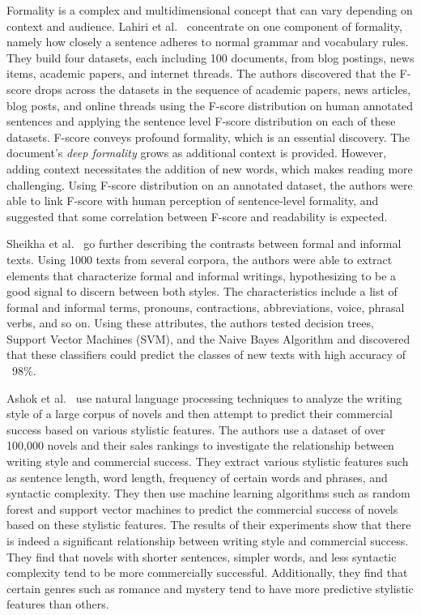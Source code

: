 \documentclass[akbc,twoside,11pt]{article}
\begin{document}
Formality is a complex and multidimensional concept that can vary depending on context and audience. Lahiri et al.~\cite{lahiri2011informality} concentrate on one component of formality, namely how closely a sentence adheres to normal grammar and vocabulary rules. They build four datasets, each including 100 documents, from blog postings, news items, academic papers, and internet threads. The authors discovered that the F-score drops across the datasets in the sequence of academic papers, news articles, blog posts, and online threads using the F-score distribution on human annotated sentences and applying the sentence level F-score distribution on each of these datasets. F-score conveys profound formality, which is an essential discovery. The document's \textit{deep formality} grows as additional context is provided. However, adding context necessitates the addition of new words, which makes reading more challenging. Using F-score distribution on an annotated dataset, the authors were able to link F-score with human perception of sentence-level formality, and suggested that some correlation between F-score and readability is expected. 

Sheikha et al.~\cite{sheikha2010automatic} go further describing the contrasts between formal and informal texts. Using 1000 texts from several corpora, the authors were able to extract elements that characterize formal and informal writings, hypothesizing to be a good signal to discern between both styles. The characteristics include a list of formal and informal terms, pronouns, contractions, abbreviations, voice, phrasal verbs, and so on. Using these attributes, the authors tested decision trees, Support Vector Machines (SVM), and the Naive Bayes Algorithm and discovered that these classifiers could predict the classes of new texts with high accuracy of ~98\%.

Ashok et al.~\cite{vikasnovels} use natural language processing techniques to analyze the writing style of a large corpus of novels and then attempt to predict their commercial success based on various stylistic features. The authors use a dataset of over 100,000 novels and their sales rankings to investigate the relationship between writing style and commercial success. They extract various stylistic features such as sentence length, word length, frequency of certain words and phrases, and syntactic complexity. They then use machine learning algorithms such as random forest and support vector machines to predict the commercial success of novels based on these stylistic features. The results of their experiments show that there is indeed a significant relationship between writing style and commercial success. They find that novels with shorter sentences, simpler words, and less syntactic complexity tend to be more commercially successful. Additionally, they find that certain genres such as romance and mystery tend to have more predictive stylistic features than others.
\end{document}
